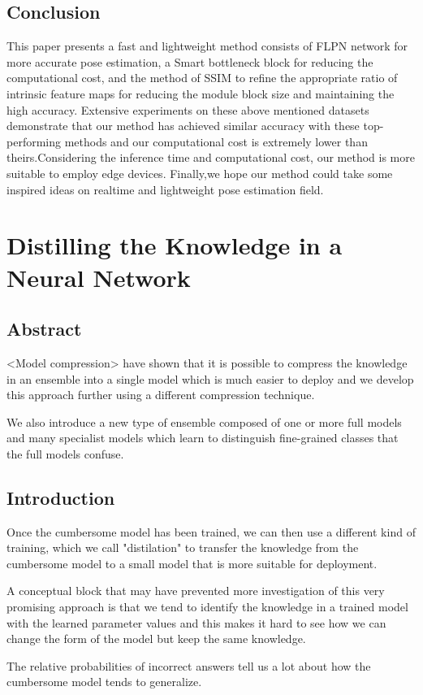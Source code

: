 \documentclass[11pt]{article}
\begin{document}
\subsection{Conclusion}
This paper presents a fast and lightweight method consists of FLPN network for more accurate pose estimation, a Smart bottleneck block for reducing the computational cost, and the method of SSIM to refine the appropriate ratio of intrinsic feature maps for reducing the module block size and maintaining the high accuracy. Extensive experiments on these above mentioned datasets demonstrate that our method has achieved similar accuracy with these top-performing methods and our computational cost is extremely lower than theirs.Considering the inference time and computational cost, our method is more suitable to employ edge devices. Finally,we hope our method could take some inspired ideas on realtime and lightweight pose estimation field.
\section{Distilling the Knowledge in a Neural Network}
\subsection{Abstract}
<Model compression> have shown that it is possible to compress the knowledge in an ensemble into a single model which is much easier to deploy and we develop this approach further using a different compression technique.

We also introduce a new type of ensemble composed of one or more full models and many specialist models which learn to distinguish fine-grained classes that the full models confuse.
\subsection{Introduction}
Once the cumbersome model has been trained, we can then use a different kind of training, which we call "distilation" to transfer the knowledge from the cumbersome model to a small model that is more suitable for deployment.

A conceptual block that may have prevented more investigation of this very promising approach is
that we tend to identify the knowledge in a trained model with the learned parameter values and this makes it hard to see how we can change the form of the model but keep the same knowledge.

The relative probabilities of incorrect answers tell us a lot about how the cumbersome model tends to generalize.
\end{document}
